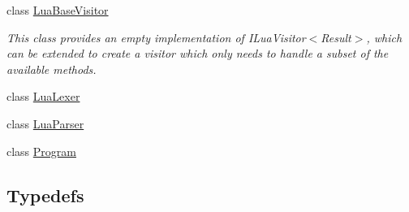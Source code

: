 \begin{DoxyCompactItemize}
class \mbox{\hyperlink{classzlua_1_1_lua_base_visitor}{Lua\+Base\+Visitor}}
\begin{DoxyCompactList}\small\item\em This class provides an empty implementation of I\+Lua\+Visitor$<$\+Result$>$, which can be extended to create a visitor which only needs to handle a subset of the available methods. \end{DoxyCompactList}\item 
class \mbox{\hyperlink{classzlua_1_1_lua_lexer}{Lua\+Lexer}}
\item 
class \mbox{\hyperlink{classzlua_1_1_lua_parser}{Lua\+Parser}}
\item 
class \mbox{\hyperlink{classzlua_1_1_program}{Program}}
\end{DoxyCompactItemize}
\subsection*{Typedefs}
